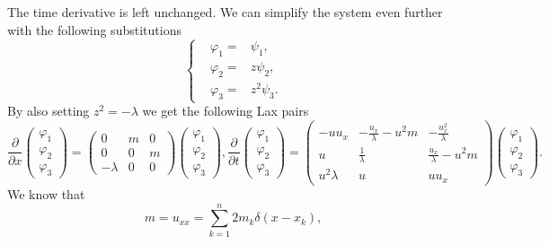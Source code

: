 \documentclass[english,master]{liumaiex}
\theoremstyle{plain}
\theoremstyle{definition}
\begin{document}
The time derivative is left unchanged. We can simplify the system even further with the following substitutions
\begin{equation}
\left\{ \begin{aligned}
	&\varphi_1 = &\psi_1, \\
	&\varphi_2 = &z\psi_2, \\
	&\varphi_3 = &z^2\psi_3.
\end{aligned} \right.
\end{equation}
By also setting $z^2 = -\lambda$ we get the following Lax pairs
\begin{subequations}
\begin{equation}
\frac{\partial}{\partial x}
\begin{pmatrix} \varphi_1 \\ \varphi_2 \\ \varphi_3 \end{pmatrix} =
\begin{pmatrix}
	0 & m & 0 \\
	0 & 0 & m \\
	-\lambda & 0 & 0
\end{pmatrix}
\begin{pmatrix} \varphi_1 \\ \varphi_2 \\ \varphi_3 \end{pmatrix}
,
\end{equation}
\begin{equation}
\frac{\partial}{\partial t}
\begin{pmatrix} \varphi_1 \\ \varphi_2 \\ \varphi_3 \end{pmatrix} =
\begin{pmatrix}
	-u u_x & -\frac{u_x}{\lambda}-u^2 m & -\frac{u_x^2}{\lambda} \\
	u & \frac{1}{\lambda} & \frac{u_x}{\lambda} - u^2 m \\
	u^2\lambda & u & uu_x
\end{pmatrix}
\begin{pmatrix} \varphi_1 \\ \varphi_2 \\ \varphi_3 \end{pmatrix}
.
\end{equation}
\end{subequations}
%
%
We know that
\begin{equation}
	m = u_{xx} = \sum_{k=1}^n 2 m_k \delta(x - x_k),
\end{equation}
\end{document}
